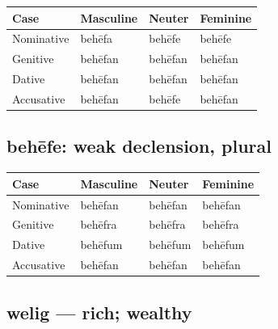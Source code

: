 \par\begingroup
\fontsize{10.5}{13.2}\selectfont
\setlength{\LTleft}{0pt}\setlength{\LTright}{\fill}
\noindent
\begin{tabular}{@{}>{\raggedright\arraybackslash}p{28.89mm}>{\raggedright\arraybackslash}p{28.89mm}>{\raggedright\arraybackslash}p{28.89mm}>{\raggedright\arraybackslash}p{28.89mm}@{}}
\toprule
\textbf{Case} & \textbf{Masculine} & \textbf{Neuter} & \textbf{Feminine} \\
\midrule
Nominative & behēfa & behēfe & behēfe \\
Genitive & behēfan & behēfan & behēfan \\
Dative & behēfan & behēfan & behēfan \\
Accusative & behēfan & behēfe & behēfan \\
\bottomrule
\end{tabular}
\par\endgroup

\subsection*{behēfe: weak declension, plural}

\par\begingroup
\fontsize{10.5}{13.2}\selectfont
\setlength{\LTleft}{0pt}\setlength{\LTright}{\fill}
\noindent
\begin{tabular}{@{}>{\raggedright\arraybackslash}p{28.89mm}>{\raggedright\arraybackslash}p{28.89mm}>{\raggedright\arraybackslash}p{28.89mm}>{\raggedright\arraybackslash}p{28.89mm}@{}}
\toprule
\textbf{Case} & \textbf{Masculine} & \textbf{Neuter} & \textbf{Feminine} \\
\midrule
Nominative & behēfan & behēfan & behēfan \\
Genitive & behēfra & behēfra & behēfra \\
Dative & behēfum & behēfum & behēfum \\
Accusative & behēfan & behēfan & behēfan \\
\bottomrule
\end{tabular}
\par\endgroup

\subsection*{welig — rich; wealthy}

